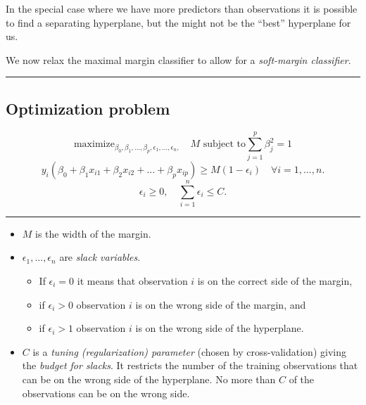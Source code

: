 \documentclass[]{article}
\providecommand{\tightlist}{%
  \setlength{\itemsep}{0pt}\setlength{\parskip}{0pt}}
\begin{document}
In the special case where we have more predictors than observations it
is possible to find a separating hyperplane, but the might not be the
``best'' hyperplane for us.

We now relax the maximal margin classifier to allow for a
\emph{soft-margin classifier}.

\begin{center}\rule{0.5\linewidth}{\linethickness}\end{center}

\hypertarget{optimization-problem}{%
\subsection{Optimization problem}\label{optimization-problem}}

\[\mathrm{maximize}_{\beta_0,\beta_1,...,\beta_p,\epsilon_1,...,\epsilon_n,} \quad M \text{ subject to} \sum_{j=1}^p \beta_j^2=1\]
\[y_i(\beta_0+\beta_1 x_{i1}+\beta_2 x_{i2}+...+\beta_p x_{ip})\geq M(1-\epsilon_i) \quad  \forall i=1,...,n.\]
\[\epsilon_i\geq 0, \quad \sum_{i=1}^n \epsilon_i \leq C.\]

\begin{center}\rule{0.5\linewidth}{\linethickness}\end{center}

\begin{itemize}
\tightlist
\item
  \(M\) is the width of the margin.
\item
  \(\epsilon_1,...,\epsilon_n\) are \emph{slack variables}.

  \begin{itemize}
  \tightlist
  \item
    If \(\epsilon_i=0\) it means that observation \(i\) is on the
    correct side of the margin,
  \item
    if \(\epsilon_i>0\) observation \(i\) is on the wrong side of the
    margin, and
  \item
    if \(\epsilon_i>1\) observation \(i\) is on the wrong side of the
    hyperplane.
  \end{itemize}
\item
  \(C\) is a \emph{tuning (regularization) parameter} (chosen by
  cross-validation) giving the \emph{budget for slacks}. It restricts
  the number of the training observations that can be on the wrong side
  of the hyperplane. No more than \(C\) of the observations can be on
  the wrong side.
\end{itemize}
\end{document}
